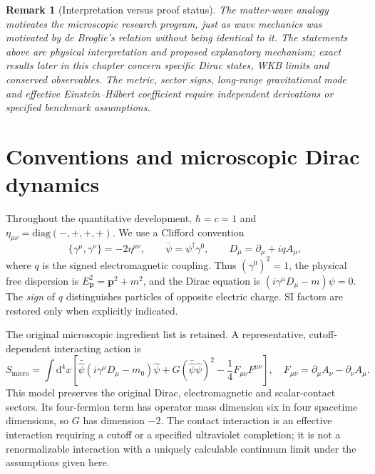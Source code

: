 \documentclass[11pt,a4paper]{article}
\newcommand{\dd}{\mathrm d}
\newtheorem{remark}{Remark}[section]
\begin{document}
\begin{remark}[Interpretation versus proof status]\label{rem:qgd-debroglie}
The matter-wave analogy motivates the microscopic research program, just as wave mechanics was motivated by de Broglie's relation without being identical to it.  The statements above are \emph{physical interpretation and proposed explanatory mechanism}; exact results later in this chapter concern specific Dirac states, WKB limits and conserved observables. The metric, sector signs, long-range gravitational mode and effective Einstein--Hilbert coefficient require independent derivations or specified benchmark assumptions.
\end{remark}

\section{Conventions and microscopic Dirac dynamics}\label{sec:micro}
Throughout the quantitative development, $\hbar=c=1$ and $\eta_{\mu\nu}=\mathrm{diag}(-,+,+,+)$. We use a Clifford convention
\begin{equation}\label{eq:clifford}
\{\gamma^\mu,\gamma^\nu\}=-2\eta^{\mu\nu},\qquad
\bar\psi=\psi^\dagger\gamma^0,\qquad
D_\mu=\partial_\mu+iqA_\mu,
\end{equation}
where $q$ is the signed electromagnetic coupling. Thus $(\gamma^0)^2=1$, the physical free dispersion is $E_{\bm p}^2=\bm p^2+m^2$, and the Dirac equation is $(i\gamma^\mu D_\mu-m)\psi=0$. The \emph{sign} of $q$ distinguishes particles of opposite electric charge. SI factors are restored only when explicitly indicated.

The original microscopic ingredient list is retained. A representative, cutoff-dependent interacting action is
\begin{equation}\label{eq:Smicro}
S_{\mathrm{micro}}=\int\dd^4x\left[
\bar{\hat\psi}(i\gamma^\mu D_\mu-m_0)\hat\psi
+G(\bar{\hat\psi}\hat\psi)^2
-\frac14 F_{\mu\nu}F^{\mu\nu}
\right],\quad F_{\mu\nu}=\partial_\mu A_\nu-\partial_\nu A_\mu.
\end{equation}
This model preserves the original Dirac, electromagnetic and scalar-contact sectors. Its four-fermion term has operator mass dimension six in four spacetime dimensions, so $G$ has dimension $-2$. The contact interaction is an effective interaction requiring a cutoff or a specified ultraviolet completion; it is not a renormalizable interaction with a uniquely calculable continuum limit under the assumptions given here.
\end{document}
